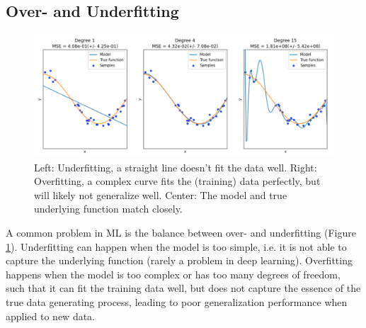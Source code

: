 \subsection{Over- and Underfitting}
\begin{figure}[h]
    \centering
    \includegraphics[width=1.2\textwidth]{chapters/NLP/figures/over_and_underfitting.png}
    \caption{Left: Underfitting, a straight line doesn't fit  the data well.
    Right: Overfitting, a complex curve fits the (training) data perfectly, but will likely not generalize well.
    Center: The model and true underlying function match closely.}
    \label{fig:over_and_underfitting}
\end{figure}
A common problem in ML is the balance between over- and underfitting (Figure \ref{fig:over_and_underfitting}).
Underfitting can happen when the model is too simple, i.e. it is not able to capture the underlying function (rarely a problem in deep learning).
Overfitting happens when the model is too complex or has too many degrees of freedom, such that it can fit the training data well, but does not capture the essence of the true data generating process, leading to poor generalization performance when applied to new data.

